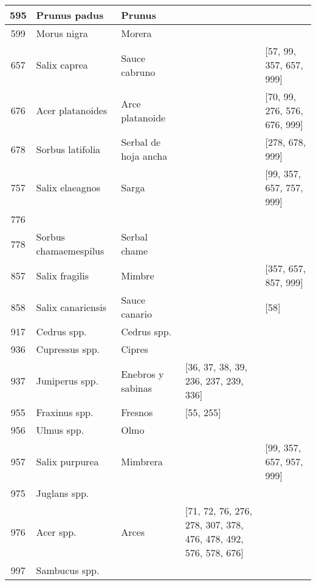\begin{landscape}
\begin{longtable}{|c|p{4cm}|p{4cm}|p{4cm}|p{4cm}|}
\hline
595 & Prunus padus & Prunus &  &  \\
\hline
599 & Morus nigra & Morera &  &  \\
\hline
657 & Salix caprea & Sauce cabruno &  & [57, 99, 357, 657, 999] \\
\hline
676 & Acer platanoides & Arce platanoide &  & [70, 99, 276, 576, 676, 999] \\
\hline
678 & Sorbus latifolia & Serbal de hoja ancha &  & [278, 678, 999] \\
\hline
757 & Salix elaeagnos & Sarga &  & [99, 357, 657, 757, 999] \\
\hline
776 &  &  &  &  \\
\hline
778 & Sorbus chamaemespilus & Serbal chame &  &  \\
\hline
857 & Salix fragilis & Mimbre &  & [357, 657, 857, 999] \\
\hline
858 & Salix canariensis & Sauce canario &  & [58] \\
\hline
917 & Cedrus spp. & Cedrus spp. &  &  \\
\hline
936 & Cupressus spp. & Cipres &  &  \\
\hline
937 & Juniperus spp. & Enebros y sabinas & [36, 37, 38, 39, 236, 237, 239, 336] &  \\
\hline
955 & Fraxinus spp. & Fresnos & [55, 255] &  \\
\hline
956 & Ulmus spp. & Olmo &  &  \\
\hline
957 & Salix purpurea & Mimbrera &  & [99, 357, 657, 957, 999] \\
\hline
975 & Juglans spp. &  &  &  \\
\hline
976 & Acer spp. & Arces & [71, 72, 76, 276, 278, 307, 378, 476, 478, 492, 576, 578, 676] &  \\
\hline
997 & Sambucus spp. &  &  &  \\
\hline
\end{longtable}
\label{tab:codificacion_especies}
\end{landscape}

